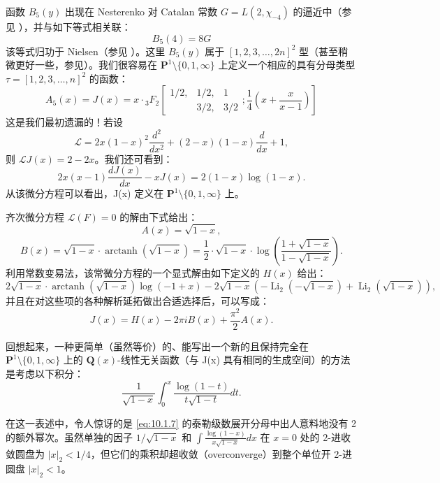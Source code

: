 函数 $B_5(y)$ 出现在 Nesterenko 对 Catalan 常数 $G = L(2, \chi_{-4})$ \cite{Nes16} 的逼近中（参见 \cite{Cat1882}），并与如下等式相关联：
\begin{equation}\label{eq:10.1.4}\tag{10.1.4}
B_5(4) = 8G
\end{equation}
该等式归功于 Nielsen（参见 \cite[第 166 页]{Nie1909}）。这里 $B_5(y)$ 属于 $[1, 2, 3, \dots, 2n]^2$ 型（甚至稍微更好一些，参见）。我们很容易在 $\mathbf{P}^1 \setminus \{0, 1, \infty\}$ 上定义一个相应的具有分母类型 $\tau = [1, 2, 3, \dots, n]^2$ 的函数：
\begin{equation}\label{eq:10.1.5}\tag{10.1.5}
A_5(x) = J(x) = x \cdot {}_{3}F_{2} \left[ \begin{smallmatrix} 1/2, & 1/2, & 1 \\ & 3/2, & 3/2 \end{smallmatrix}; \frac{1}{4} \left( x + \frac{x}{x-1} \right) \right]
\end{equation}
这是我们最初遗漏的！若设
\[ \mathcal{L} = 2x(1-x)^2 \frac{d^2}{dx^2} + (2-x)(1-x)\frac{d}{dx} + 1, \]
则 $\mathcal{L}J(x) = 2 - 2x$。我们还可看到：
\begin{equation}\label{eq:10.1.6}\tag{10.1.6}
2x(x-1)\frac{dJ(x)}{dx} - xJ(x) = 2(1-x)\log(1-x).
\end{equation}
从该微分方程可以看出，J(x) 定义在 $\mathbf{P}^1 \setminus \{0, 1, \infty\}$ 上。

齐次微分方程 $\mathcal{L}(F) = 0$ 的解由下式给出：
\[ A(x) = \sqrt{1 - x}, \]
\[ B(x) = \sqrt{1-x} \cdot \operatorname{arctanh}(\sqrt{1-x}) = \frac{1}{2} \cdot \sqrt{1-x} \cdot \log \left( \frac{1+\sqrt{1-x}}{1-\sqrt{1-x}} \right). \]
利用常数变易法，该常微分方程的一个显式解由如下定义的 $H(x)$ 给出：
\[ 2\sqrt{1-x} \cdot \operatorname{arctanh}(\sqrt{1-x}) \log(-1+x) - 2\sqrt{1-x} \left( -\operatorname{Li}_2\left(-\sqrt{1-x}\right) + \operatorname{Li}_2\left(\sqrt{1-x}\right) \right), \]
并且在对这些项的各种解析延拓做出合适选择后，可以写成：
\[ J(x) = H(x) - 2\pi i B(x) + \frac{\pi^2}{2} A(x). \]

回想起来，一种更简单（虽然等价）的、能写出一个新的且保持完全在 $\mathbf{P}^1 \setminus \{0,1,\infty\}$ 上的 $\mathbf{Q}(x)$-线性无关函数（与 J(x) 具有相同的生成空间）的方法是考虑以下积分：
\begin{equation}\label{eq:10.1.7}\tag{10.1.7}
\frac{1}{\sqrt{1-x}} \int_0^x \frac{\log(1-t)}{t\sqrt{1-t}} dt.
\end{equation}

在这一表述中，令人惊讶的是 \eqref{eq:10.1.7} 的泰勒级数展开分母中出人意料地没有 2 的额外幂次。虽然单独的因子 $1/\sqrt{1-x}$ 和 $\int \frac{\log(1-x)}{x\sqrt{1-x}} dx$ 在 $x=0$ 处的 2-进收敛圆盘为 $|x|_2 < 1/4$，但它们的乘积却超收敛（overconverge）到整个单位开 2-进圆盘 $|x|_2 < 1$。

